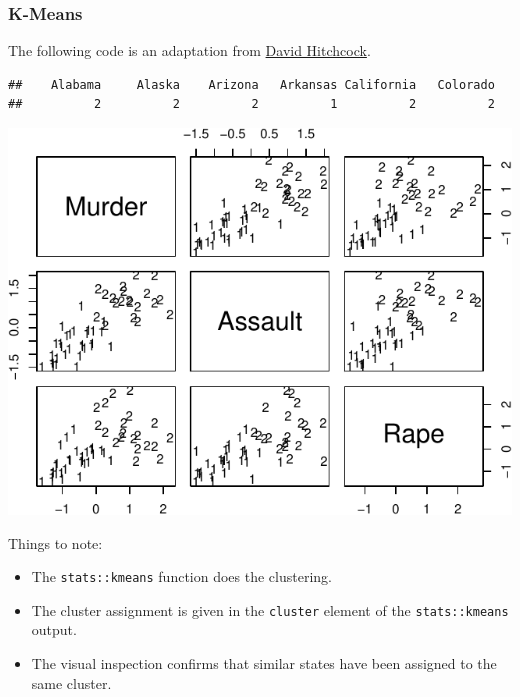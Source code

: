 \documentclass[]{book}
\newenvironment{Shaded}{\begin{snugshade}}{\end{snugshade}}
\newcommand{\KeywordTok}[1]{\textcolor[rgb]{0.13,0.29,0.53}{\textbf{#1}}}
\newcommand{\DataTypeTok}[1]{\textcolor[rgb]{0.13,0.29,0.53}{#1}}
\newcommand{\DecValTok}[1]{\textcolor[rgb]{0.00,0.00,0.81}{#1}}
\newcommand{\StringTok}[1]{\textcolor[rgb]{0.31,0.60,0.02}{#1}}
\newcommand{\CommentTok}[1]{\textcolor[rgb]{0.56,0.35,0.01}{\textit{#1}}}
\newcommand{\ControlFlowTok}[1]{\textcolor[rgb]{0.13,0.29,0.53}{\textbf{#1}}}
\newcommand{\OperatorTok}[1]{\textcolor[rgb]{0.81,0.36,0.00}{\textbf{#1}}}
\newcommand{\NormalTok}[1]{#1}
\providecommand{\tightlist}{%
  \setlength{\itemsep}{0pt}\setlength{\parskip}{0pt}}
\theoremstyle{definition}
\theoremstyle{definition}
\theoremstyle{definition}
\theoremstyle{remark}
\begin{document}
\subsubsection{K-Means}\label{k-means-2}

The following code is an adaptation from
\href{http://people.stat.sc.edu/Hitchcock/chapter6_R_examples.txt}{David
Hitchcock}.

\begin{Shaded}
\end{Shaded}

\begin{verbatim}
##    Alabama     Alaska    Arizona   Arkansas California   Colorado 
##          2          2          2          1          2          2
\end{verbatim}

\begin{Shaded}
\end{Shaded}

\includegraphics[width=0.5\linewidth]{Rcourse_files/figure-latex/kmeans-1}

Things to note:

\begin{itemize}
\tightlist
\item
  The \texttt{stats::kmeans} function does the clustering.
\item
  The cluster assignment is given in the \texttt{cluster} element of the
  \texttt{stats::kmeans} output.
\item
  The visual inspection confirms that similar states have been assigned
  to the same cluster.
\end{itemize}
\end{document}
